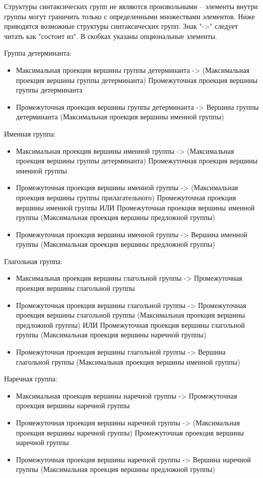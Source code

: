 Структуры синтаксических групп не являются произвольными -- элементы внутри группы могут граничить только с определенными множествами элементов.
Ниже приводятся возможные структуры синтаксических групп.
Знак "->" следует читать как "состоит из".
В скобках указаны опциональные элементы.

Группа детерминанта:
\begin{itemize}
    \item Максимальная проекция вершины группы детерминанта -> (Максимальная проекция вершины группы детерминанта) Промежуточная проекция вершины группы детерминанта
    \item Промежуточная проекция вершины группы детерминанта -> Вершина группы детерминанта (Максимальная проекция вершины именной группы)
\end{itemize}

Именная группа:
\begin{itemize}
    \item Максимальная проекция вершины именной группы -> (Максимальная проекция вершины группы детерминанта) Промежуточная проекция вершины именной группы
    \item Промежуточная проекция вершины именной группы -> (Максимальная проекция вершины группы прилагательного) Промежуточная проекция вершины именной группы ИЛИ Промежуточная проекция вершины именной группы (Максимальная проекция вершины предложной группы)
    \item Промежуточная проекция вершины именной группы -> Вершина именной группы (Максимальная проекция вершины предложной группы)
\end{itemize}

Глагольная группа:
\begin{itemize}
    \item Максимальная проекция вершины глагольной группы -> Промежуточная проекция вершины глагольной группы
    \item Промежуточная проекция вершины глагольной группы -> Промежуточная проекция вершины глагольной группы (Максимальная проекция вершины предложной группы) ИЛИ Промежуточная проекция вершины глагольной группы (Максимальная проекция вершины наречной группы)
    \item Промежуточная проекция вершины глагольной группы -> Вершина глагольной группы (Максимальная проекция вершины именной группы)
\end{itemize}

Наречная группа:
\begin{itemize}
    \item Максимальная проекция вершины наречной группы -> Промежуточная проекция вершины наречной группы
    \item Промежуточная проекция вершины наречной группы -> (Максимальная проекция вершины наречной группы) Промежуточная проекция вершины наречной группы
    \item Промежуточная проекция вершины наречной группы -> Вершина наречной группы (Максимальная проекция вершины предложной группы)
\end{itemize}

